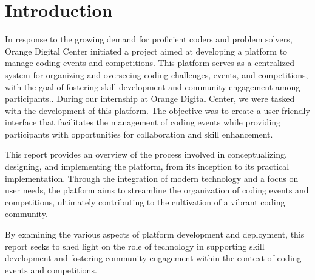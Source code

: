 \chapter*{Introduction}
\label{chap:Introduction}

In response to the growing demand for proficient coders and problem solvers, Orange Digital Center initiated a project aimed at developing a platform to manage coding events and competitions. This platform serves as a centralized system for organizing and overseeing coding challenges, events, and competitions, with the goal of fostering skill development and community engagement among participants.. 
\bigskip
During our internship at Orange Digital Center, we were tasked with the development of this platform. The objective was to create a user-friendly interface that facilitates the management of coding events while providing participants with opportunities for collaboration and skill enhancement.\bigskip

This report provides an overview of the process involved in conceptualizing,
designing, and implementing the platform, from its inception to its practical
implementation. Through the integration of modern technology and a focus
on user needs, the platform aims to streamline the organization of coding events
and competitions, ultimately contributing to the cultivation of a vibrant 
coding community.\bigskip

By examining the various aspects of platform development and deployment,
this report seeks to shed light on the role of technology in supporting skill
development and fostering community engagement within the context of coding
events and competitions.
